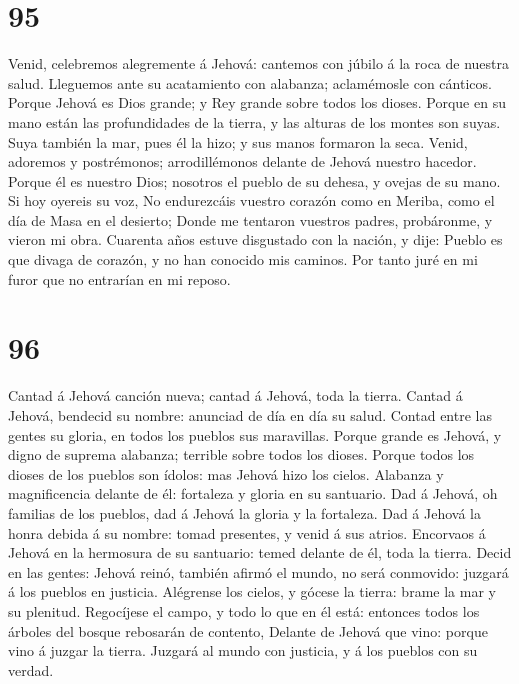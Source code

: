 \hypertarget{section-94}{%
\section{95}\label{section-94}}

 Venid, celebremos alegremente á Jehová: cantemos con júbilo
á la roca de nuestra salud.  Lleguemos ante su acatamiento
con alabanza; aclamémosle con cánticos.  Porque Jehová es
Dios grande; y Rey grande sobre todos los dioses.  Porque en
su mano están las profundidades de la tierra, y las alturas de los
montes son suyas.  Suya también la mar, pues él la hizo; y
sus manos formaron la seca.  Venid, adoremos y postrémonos;
arrodillémonos delante de Jehová nuestro hacedor.  Porque él
es nuestro Dios; nosotros el pueblo de su dehesa, y ovejas de su mano.
Si hoy oyereis su voz,  No endurezcáis vuestro corazón como
en Meriba, como el día de Masa en el desierto;  Donde me
tentaron vuestros padres, probáronme, y vieron mi obra. 
Cuarenta años estuve disgustado con la nación, y dije: Pueblo es que
divaga de corazón, y no han conocido mis caminos.  Por
tanto juré en mi furor que no entrarían en mi reposo.

\hypertarget{section-95}{%
\section{96}\label{section-95}}

 Cantad á Jehová canción nueva; cantad á Jehová, toda la
tierra.  Cantad á Jehová, bendecid su nombre: anunciad de
día en día su salud.  Contad entre las gentes su gloria, en
todos los pueblos sus maravillas.  Porque grande es Jehová,
y digno de suprema alabanza; terrible sobre todos los dioses.
 Porque todos los dioses de los pueblos son ídolos: mas
Jehová hizo los cielos.  Alabanza y magnificencia delante de
él: fortaleza y gloria en su santuario.  Dad á Jehová, oh
familias de los pueblos, dad á Jehová la gloria y la fortaleza.
 Dad á Jehová la honra debida á su nombre: tomad presentes,
y venid á sus atrios.  Encorvaos á Jehová en la hermosura de
su santuario: temed delante de él, toda la tierra.  Decid
en las gentes: Jehová reinó, también afirmó el mundo, no será conmovido:
juzgará á los pueblos en justicia.  Alégrense los cielos, y
gócese la tierra: brame la mar y su plenitud.  Regocíjese
el campo, y todo lo que en él está: entonces todos los árboles del
bosque rebosarán de contento,  Delante de Jehová que vino:
porque vino á juzgar la tierra. Juzgará al mundo con justicia, y á los
pueblos con su verdad.

